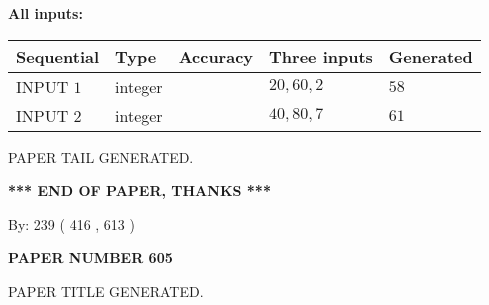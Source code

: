 \documentclass[12pt]{article}
\begin{document}
   
\noindent\vspace{0.1in}\hspace{-0.08in} {\textbf{\Large{All inputs: }}}
   
   
  
  
\noindent\begin{tabular}{|l|l|l|l|l|}
\hline
 Sequential & Type & Accuracy & Three inputs & Generated \\ 
\hline
 
 
  INPUT $  1 $ & integer &  & $
 20
 , 
 60
 , 
 2
 $ & $ 58 $ 
 \\  \hline  
 
 
  INPUT $  2 $ & integer &  & $
 40
 , 
 80
 , 
 7
 $ & $ 61 $ 
 \\  \hline  
 \end{tabular}
   
   
   
   
   
   
 \vspace{0.2in}
 
   
   
\vspace{2.0in} PAPER TAIL GENERATED.
   
   
   
   
\vspace{1.0in} 
{\textbf{\large{ *** END OF PAPER, THANKS *** }}} 
   
   
\hspace{1.0in} By: 
 239 ( 416 ,  613 )
   
   
   
   
\newpage 
\setcounter{page}{ 
   605001 } 
   
   
   
   
 {\textbf{ \Large{ PAPER NUMBER  605  }}}
   
   
\vspace{0.2in}
   
   
   
   
   
   
   
   
 \vspace{0.2in}
 
 
 
 
   
   
 PAPER TITLE GENERATED.
   
   
   
\vspace{0.2in}
   
\end{document}
